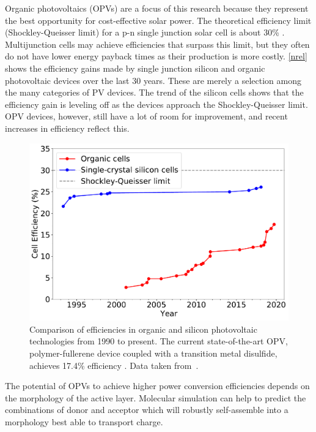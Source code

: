 Organic photovoltaics (OPVs) are a focus of this research because they represent the best opportunity for cost-effective solar power.
The theoretical efficiency limit (Shockley-Queisser limit) for a p-n single junction solar cell is about 30\% \citep{Shockley1961}.
Multijunction cells may achieve efficiencies that surpass this limit, but they often do not have lower energy payback times as their production is more costly.
\autoref{nrel} shows the efficiency gains made by single junction silicon and organic photovoltaic devices over the last 30 years.
These are merely a selection among the many categories of PV devices.
The trend of the silicon cells shows that the efficiency gain is leveling off as the devices approach the Shockley-Queisser limit.
OPV devices, however, still have a lot of room for improvement, and recent increases in efficiency reflect this.
\begin{figure}[h!]
    \centering
    \includegraphics[width=0.8\linewidth]{figures/p3ht_val/NREL2020.pdf}
    \caption{Comparison of efficiencies in organic and silicon photovoltaic technologies from 1990 to present. The current state-of-the-art OPV, polymer-fullerene device coupled with a transition metal disulfide, achieves 17.4\% efficiency \citep{Lin2019}. Data taken from~\citet{NREL2020}.}\label{nrel}
\end{figure}
The potential of OPVs to achieve higher power conversion efficiencies depends on the morphology of the active layer. 
Molecular simulation can help to predict the combinations of donor and acceptor which will robustly self-assemble into a morphology best able to transport charge. 

